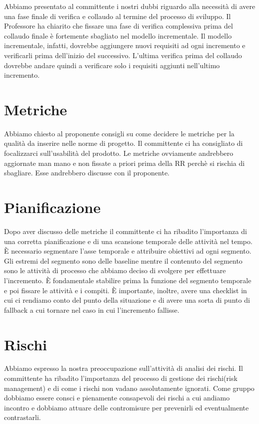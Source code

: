 \documentclass{article}
\begin{document}
Abbiamo presentato al committente i nostri dubbi riguardo alla necessità di avere una fase finale di verifica e collaudo al termine del processo di sviluppo. Il Professore ha chiarito che fissare una fase di verifica complessiva prima del collaudo finale è fortemente sbagliato nel modello incrementale. Il modello incrementale, infatti, dovrebbe aggiungere nuovi requisiti ad ogni incremento e verificarli prima dell'inizio del successivo. L'ultima verifica prima del collaudo dovrebbe andare quindi a verificare solo i requisiti aggiunti nell'ultimo incremento.

\section{Metriche}%
\label{sec:metriche}

Abbiamo chiesto al proponente consigli su come decidere le metriche per la qualità da inserire nelle norme di progetto. Il committente ci ha consigliato di focalizzarci sull'usabilità del prodotto. Le metriche ovviamente andrebbero aggiornate man mano e non fissate a priori prima della RR perchè si rischia di sbagliare. Esse andrebbero discusse con il proponente.

\section{Pianificazione}%
\label{sec:pianificazione}

Dopo aver discusso delle metriche il committente ci ha ribadito l'importanza di una corretta pianificazione e di una scansione temporale delle attività nel tempo. È necessario segmentare l'asse temporale e attribuire obiettivi ad ogni segmento. Gli estremi del segmento sono delle baseline mentre il contenuto del segmento sono le attività di processo che abbiamo deciso di svolgere per effettuare l'incremento. È fondamentale stabilire prima la funzione del segmento temporale e poi fissare le attività e i compiti. È importante, inoltre, avere una checklist in cui ci rendiamo conto del punto della situazione e di avere una sorta di punto di fallback a cui tornare nel caso in cui l'incremento fallisse.

\section{Rischi}%
\label{sec:rischi}

Abbiamo espresso la nostra preoccupazione sull'attività di analisi dei rischi. Il committente ha ribadito l'importanza del processo di gestione dei rischi(risk management) e di come i rischi non vadano assolutamente ignorati. Come gruppo dobbiamo essere consci e pienamente consapevoli dei rischi a cui andiamo incontro e dobbiamo attuare delle contromisure per prevenirli ed eventualmente contrastarli.
\end{document}
